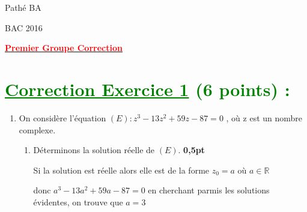 \documentclass[12pt]{article}
\begin{document}
\begin{minipage}{0.8\textwidth}
	Pathé BA                          
\end{minipage}
\begin{minipage}{0.8\textwidth}
	BAC 2016
\end{minipage}

\begin{center}
\textbf{{\underline{\textcolor{red}{Premier Groupe Correction}}}}
\end{center}
\section*{\textcolor{green}{\underline{Correction Exercice 1} (6 points) :}}
\begin{enumerate}
	\item On considère l’équation $(E): z^{3}-13z^{2}+59z-87=0$ , où z est un nombre complexe.
	\begin{enumerate}
		\item Déterminons la solution réelle de $(E)$.\textbf{ 0,5pt}
		
		Si la solution est réelle alors elle est de la forme $z_{0}=a$ où $a\in \mathbb{R}$
		
		donc $a^{3}-13a^{2}+59a-87=0$ en cherchant parmis les solutions évidentes, on trouve que $a=3$
		
	\end{enumerate}
	
		
		
\end{enumerate}
\end{document}
